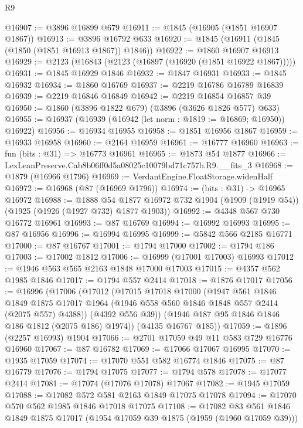 \begin{lexlean}{R9}
\begin{coremodule}
@16907 := @3896 @16899 @679
@16911 := @1845 (@16905 (@1851 @16907 @1867))
@16913 := @3896 @16792 @633
@16920 := @1845 (@16911 (@1845 (@1850 (@1851 @16913 @1867)) @1846))
@16922 := @1860 @16907 @16913
@16929 := @2123 (@16843 (@2123 (@16897 (@16920 (@1851 @16922 @1867)))))
@16931 := @1845 @16929 @1846
@16932 := @1847 @16931
@16933 := @1845 @16932
@16934 := @1860 @16769
@16937 := @2219 @16786 @16789 @16839
@16939 := @2219 @16846 @16849
@16942 := @2219 @16854 @16857 @39
@16950 := @1860 (@3896 @1822 @679) (@3896 (@3626 @1826 @577) @633)
@16955 := @16937 (@16939 (@16942 (let norm : @1819 := @16869; @16950)) @16922)
@16956 := @16934 @16955
@16958 := @1851 @16956 @1867
@16959 := @16933 @16958
@16960 := @2164 @16959
@16961 := @16777 @16960
@16963 := fun (bits : @31) => @16773 @16961
@16965 := @1873 @54 @1877
@16966 := LexLeanPreserve.Cab8b06ff0d5a08025c10079bd71c757b.R9.__fits_3
@16968 := @1879 (@16966 @1796)
@16969 := VerdantEngine.FloatStorage.widenHalf
@16972 := @16968 (@87 (@16969 @1796))
@16974 := (bits : @31) -> @16965 @16972
@16988 := @1888
    @54
    @1877
    @16972
    @732
    @1904
    (@1909 (@1919 @54))
    (@1925 (@1926 (@1927 @732) @1877 @1903))
@16992 := @4348 @567 @730 @16772 @16961
@16993 := @87 @16769
@16994 := @16992 @16993
@16995 := @87 @16956
@16996 := @16994 @16995
@16999 := @5842 @566 @2185 @16771
@17000 := @87 @16767
@17001 := @1794 @17000
@17002 := @1794 @186
@17003 := @17002 @1812
@17006 := @16999 (@17001 @17003) @16993
@17012 := @1946 @563 @565 @2163 @1848 @17000 @17003
@17015 := @4357 @562 @1985 @1846
@17017 := @1794 @557 @2414
@17018 := @1876 @17017
@17056 := @16996
    (@17006
      (@17012
        (@17015
          @17018
          @17000
          (@1947
            @561
            @1846
            @1849
            @1875
            @17017
            @1964
            (@1946 @558 @560 @1846 @1848 @557 @2414 (@2075 @557) @4388))
          (@4392 @556 @39))
        (@1946 @187 @95 @1846 @1846 @186 @1812 (@2075 @186) @1974))
      (@4135 @16767 @185))
@17059 := @1896 (@2257 @16993) @1904
@17066 := @2701 @17059 @49 @11 @583 @729 @16776 @16960
@17067 := @87 @16782
@17069 := @17066 @17067 @16995
@17070 := @1935 @17059
@17074 := @17070 @551 @582 @16774 @1846
@17075 := @87 @16779
@17076 := @1794 @17075
@17077 := @1794 @578
@17078 := @17077 @2414
@17081 := @17074 (@17076 @17078) @17067
@17082 := @1945 @17059
@17088 := @17082 @572 @581 @2163 @1849 @17075 @17078
@17094 := @17070 @570 @562 @1985 @1846 @17018 @17075
@17108 := @17082
    @83
    @561
    @1846
    @1849
    @1875
    @17017
    (@1954 @17059 @39 @1875 (@1959 (@1960 @17059 @39)))

\end{coremodule}
\end{lexlean}
